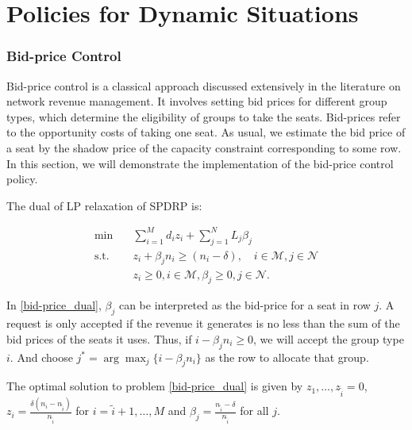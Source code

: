 
\section{Policies for Dynamic Situations}\label{policies}

\subsubsection*{Bid-price Control}
Bid-price control is a classical approach discussed extensively in the literature on network revenue management. It involves setting bid prices for different group types, which determine the eligibility of groups to take the seats. Bid-prices refer to the opportunity costs of taking one seat. As usual, we estimate the bid price of a seat by the shadow price of the capacity constraint corresponding to some row. In this section, we will demonstrate the implementation of the bid-price control policy. 

The dual of LP relaxation of SPDRP is:

\begin{equation}\label{bid-price_dual}
  \begin{aligned}
  \min \quad & \sum_{i=1}^{M} d_i z_i + \sum_{j= 1}^{N} L_j \beta_{j} \\
  \text {s.t.} \quad & z_{i} + \beta_j n_i \geq (n_i-\delta), \quad i \in \mathcal{M}, j \in \mathcal{N} \\
  & z_{i} \geq 0, i \in \mathcal{M}, \beta_{j} \geq 0, j \in \mathcal{N}.
  \end{aligned}
\end{equation}

In \eqref{bid-price_dual}, $\beta_{j}$ can be interpreted as the bid-price for a seat in row $j$. A request is only accepted if the revenue it generates is no less than the sum of the bid prices of the seats it uses. Thus, if $i -\beta_{j} n_i \geq 0$, we will accept the group type $i$. And choose $j^{*} = \arg \max_{j} \{i -\beta_{j} n_i\}$ as the row to allocate that group.


\begin{lem}\label{bid-price}
 The optimal solution to problem \eqref{bid-price_dual} is given by $z_1 ,\ldots, z_{\tilde{i}} =0$, $z_{i} = \frac{\delta(n_i-n_{\tilde{i}})}{n_{\tilde{i}}}$ for $i = \tilde{i}+1, \ldots, M$ and $\beta_j = \frac{n_{\tilde{i}} - \delta}{n_{\tilde{i}}}$ for all $j$.
\end{lem}

